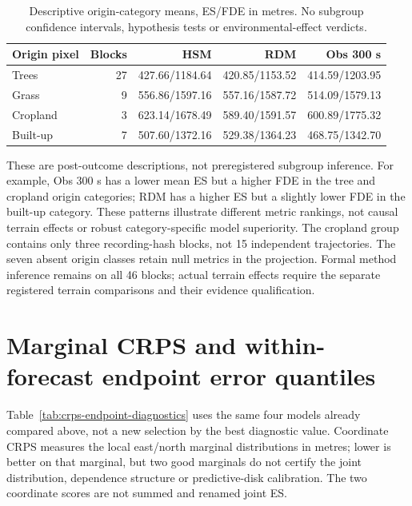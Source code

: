 \begin{table}[htbp]
\centering\small
\caption{Descriptive origin-category means, ES/FDE in metres. No subgroup
confidence intervals, hypothesis tests or environmental-effect verdicts.}
\label{tab:origin-cover-methods}\hypertarget{tab:origin-cover-methods}{}
\begin{tabular}{lrrrr}
\toprule
Origin pixel & Blocks & HSM & RDM & Obs 300 s\\
\midrule
Trees & 27 & 427.66/1184.64 & 420.85/1153.52 & 414.59/1203.95\\
Grass & 9 & 556.86/1597.16 & 557.16/1587.72 & 514.09/1579.13\\
Cropland & 3 & 623.14/1678.49 & 589.40/1591.57 & 600.89/1775.32\\
Built-up & 7 & 507.60/1372.16 & 529.38/1364.23 & 468.75/1342.70\\
\bottomrule
\end{tabular}
\end{table}

These are post-outcome descriptions, not preregistered subgroup inference.
For example, Obs 300 s has a lower mean ES but a higher FDE in the tree and
cropland origin categories; RDM has a higher ES but a slightly lower FDE in
the built-up category. These patterns illustrate different metric rankings,
not causal terrain effects or robust category-specific model superiority.
The cropland group contains only three recording-hash blocks, not 15
independent trajectories. The seven absent origin classes retain null
metrics in the projection. Formal method inference remains on all 46
blocks; actual terrain effects require the separate registered terrain
comparisons and their evidence qualification.





\section{Marginal CRPS and within-forecast endpoint error quantiles}
\label{sec:secondary-score-diagnostics}\hypertarget{sec:secondary-score-diagnostics}{}
Table~\ref{tab:crps-endpoint-diagnostics} uses the same four models already
compared above, not a new selection by the best diagnostic value. Coordinate
CRPS measures the local east/north marginal distributions in metres; lower is
better on that marginal, but two good marginals do not certify the joint
distribution, dependence structure or predictive-disk calibration. The two
coordinate scores are not summed and renamed joint ES.

